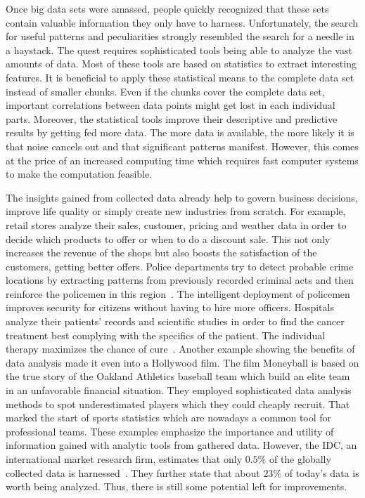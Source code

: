 Once big data sets were amassed, people quickly recognized that these sets contain valuable information they only have to harness.
Unfortunately, the search for useful patterns and peculiarities strongly resembled the search for a needle in a haystack.
The quest requires sophisticated tools being able to analyze the vast amounts of data.
Most of these tools are based on statistics to extract interesting features.
It is beneficial to apply these statistical means to the complete data set instead of smaller chunks.
Even if the chunks cover the complete data set, important correlations between data points might get lost in each individual parts.
Moreover, the statistical tools improve their descriptive and predictive results by getting fed more data.
The more data is available, the more likely it is that noise cancels out and that significant patterns manifest.
However, this comes at the price of an increased computing time which requires fast computer systems to make the computation feasible.

The insights gained from collected data already help to govern business decisions, improve life quality or simply create new industries from scratch.
For example, retail stores analyze their sales, customer, pricing and weather data in order to decide which products to offer or when to do a discount sale.
This not only increases the revenue of the shops but also boosts the satisfaction of the customers, getting better offers. 
Police departments try to detect probable crime locations by extracting patterns from previously recorded criminal acts and then reinforce the policemen in  this region~\cite{lohr:yt2012a}.
The intelligent deployment of policemen improves security for citizens without having to hire more officers.
Hospitals analyze their patients' records and scientific studies in order to find the cancer treatment best complying with the specifics of the patient.
The individual therapy maximizes the chance of cure~\cite{watson:2013a}.
Another example showing the benefits of data analysis made it even into a Hollywood film.
The film Moneyball is based on the true story of the Oakland Athletics baseball team which build an elite team in an unfavorable financial situation.
They employed sophisticated data analysis methods to spot underestimated players which they could cheaply recruit.
That marked the start of sports statistics which are nowadays a common tool for professional teams.
These examples emphasize the importance and utility of information gained with analytic tools from gathered data.
However, the IDC, an international market research firm, estimates that only $0.5\%$ of the globally collected data is harnessed~\cite{gantz:iaf2012a}.
They further state that about $23\%$ of today's data is worth being analyzed.
Thus, there is still some potential left for improvements.

